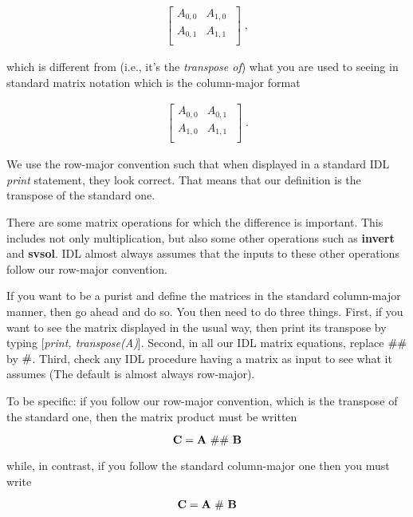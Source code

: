 \documentclass[psfig,preprint]{aastex}
\begin{document}
\begin{mathletters}
\begin{eqnarray}
\left[
\begin{array}{rrr}
A_{0,0} & A_{1,0} \\
A_{0,1} & A_{1,1} \\
\end{array}
\; \right] \; ,
\end{eqnarray}

\noindent which is different from (i.e., it's the {\it transpose of}) what
you are used to seeing in standard matrix notation which is the
column-major format

\begin{eqnarray}
\left[
\begin{array}{rrr}
A_{0,0} & A_{0,1} \\
A_{1,0} & A_{1,1} \\
\end{array}
\; \right] \; .
\end{eqnarray}
\end{mathletters}  

        We use the row-major convention such that when displayed in a
standard IDL {\it print} statement, they look correct. That means that
our definition is the transpose of the standard one.

        There are some matrix operations for which the difference is
important. This includes not only multiplication, but also some other
operations such as {\bf invert} and {\bf svsol}. IDL almost always
assumes that the inputs to these other operations follow our row-major
convention.

        If you want to be a purist and define the matrices in the
standard column-major manner, then go ahead and do so.  You then need to
do three things.  First, if you want to see the matrix displayed in the
usual way, then print its transpose by typing [{\it print,
transpose(A)}].  Second, in all our IDL matrix equations, replace ${\bf
\# \#}$ by ${\bf \#}$. Third, check any IDL procedure having a matrix as
input to see what it assumes (The default is almost always row-major).
        
        To be specific: if you follow our row-major convention, which is the
transpose of the standard one, then the matrix product must be written

\begin{mathletters}
\begin{equation}
{\bf C = A \ \# \# \ B}
\end{equation}

\noindent while, in contrast, if you follow the standard  
column-major one then you must write

\begin{equation}
{\bf C = A \ \# \ B}
\end{equation}
\end{mathletters}
\end{document}
